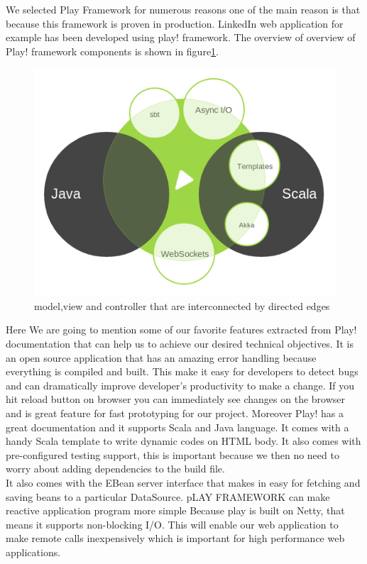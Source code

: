 We selected Play Framework for numerous reasons one of the main reason is that because this framework is proven in production. LinkedIn web application for example has been developed using play! framework. The overview of overview of Play! framework components is shown in figure\ref{play}.\\

\begin{figure}[h]
\centering
\includegraphics[scale=0.5]{./img/play.png}
\caption{\small{model,view and controller that are interconnected by directed edges}}
\label{play}
	
\end{figure}
 
Here We are going to mention some of our favorite features extracted from Play! documentation \cite{playDoc} that can help us to achieve our desired technical objectives. It is an open source application that has an amazing error handling because everything is compiled and built. This make it easy for developers to detect bugs and can dramatically improve developer's productivity to make a change. If you hit reload button on browser you can immediately see changes on the browser and is great feature for fast prototyping for our project. Moreover Play! has a great documentation and it supports Scala and Java language. It comes with a handy Scala template to write dynamic codes on HTML body. It also comes with pre-configured testing support, this is important because we then no need to worry about adding dependencies to the build file.\\
It also comes with the EBean server interface that makes in easy for fetching and saving beans to a particular DataSource. pLAY FRAMEWORK can make reactive application program more simple Because play is built on Netty, that means it supports non-blocking I/O. This will enable our web application to make remote calls inexpensively which is important for high performance web applications.






